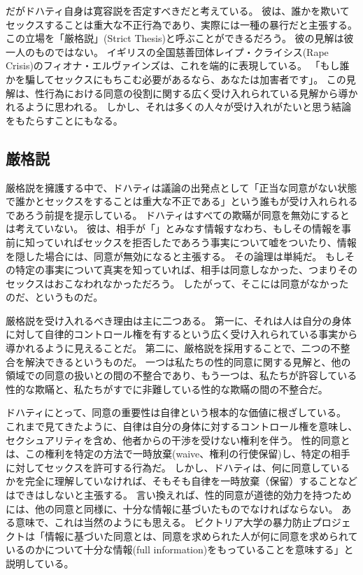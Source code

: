 \documentclass[paper=a4,book,openany]{jlreq} \usepackage{mystyle}
\begin{document}
だがドハティ自身は寛容説を否定すべきだと考えている。
彼は、誰かを欺いてセックスすることは重大な不正行為であり、実際には一種の暴行だと主張する。
この立場を「厳格説」(Strict Thesis)と呼ぶことができるだろう。
彼の見解は彼一人のものではない。
イギリスの全国慈善団体レイプ・クライシス(Rape Crisis)のフィオナ・エルヴァインズは、これを端的に表現している。
「もし誰かを騙してセックスにもちこむ必要があるなら、あなたは加害者です」\citep{sanghani14:_lied_your_way_sex}。
この見解は、性行為における同意の役割に関する広く受け入れられている見解から導かれるように思われる。
しかし、それは多くの人々が受け入れがたいと思う結論をもたらすことにもなる。

\subsection{厳格説}

厳格説を擁護する中で、ドハティは議論の出発点として「正当な同意がない状態で誰かとセックスをすることは重大な不正である」という誰もが受け入れられるであろう前提を提示している\citep[p.722]{dougherty13:_sex_lies_consen}。
ドハティはすべての欺瞞が同意を無効にするとは考えていない。
彼は、相手が「」とみなす情報{\DDASH}すなわち、もしその情報を事前に知っていればセックスを拒否したであろう事実{\DDASH}について嘘をついたり、情報を隠した場合には、同意が無効になると主張する。
その論理は単純だ。
もしその特定の事実について真実を知っていれば、相手は同意しなかった、つまりそのセックスはおこなわれなかっただろう。
したがって、そこには同意がなかったのだ、というものだ。

厳格説を受け入れるべき理由は主に二つある。
第一に、それは人は自分の身体に対して自律的コントロール権を有するという広く受け入れられている事実から導かれるように見えることだ。
第二に、厳格説を採用することで、二つの不整合を解決できるというものだ。
一つは私たちの性的同意に関する見解と、他の領域での同意の扱いとの間の不整合であり、もう一つは、私たちが許容している性的な欺瞞と、私たちがすでに非難している性的な欺瞞の間の不整合だ。

ドハティにとって、同意の重要性は自律という根本的な価値に根ざしている。
これまで見てきたように、自律は自分の身体に対するコントロール権を意味し、セクシュアリティを含め、他者からの干渉を受けない権利を伴う。
性的同意とは、この権利を特定の方法で一時放棄(waive、権利の行使保留)し、特定の相手に対してセックスを許可する行為だ。
しかし、ドハティは、何に同意しているかを完全に理解していなければ、そもそも自律を一時放棄（保留）することなどはできはしないと主張する。
言い換えれば、性的同意が道徳的効力を持つためには、他の同意と同様に、十分な情報に基づいたものでなければならない。
ある意味で、これは当然のようにも思える。
ビクトリア大学の暴力防止プロジェクトは「情報に基づいた同意とは、同意を求められた人が何に同意を求められているのかについて十分な情報(full information)をもっていることを意味する」と説明している\citep{project25:_consen}。
\end{document}
